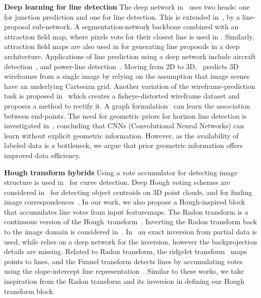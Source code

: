 \documentclass[runningheads]{llncs}
\begin{document}
\textbf{Deep learning for line detection}
The deep network in~\cite{huang2018learning} uses two heads: one for junction prediction and one for line detection. This is extended in~\cite{zhou2019end}, by a line-proposal sub-network.
A segmentation-network backbone combined with an attraction field map, where pixels vote for their closest line is used in \cite{xue2019learning}.
Similarly, attraction field maps are also used in \cite{xue2020holistically} for generating line proposals in a deep architecture.  Applications of line prediction using a deep network include aircraft detection~\cite{wei2019x}, and  power-line detection~\cite{nguyen2019ls}. Moving from 2D to 3D,~\cite{zhou2019learning} predicts 3D wireframes from a single image by relying on the assumption that image scenes have an underlying Cartesian grid.
Another variation of the wireframe-prediction task is proposed in~\cite{xue2019learning} which creates a fisheye-distorted wireframe dataset and proposes a method to rectify it. A graph formulation~\cite{zhang2019ppgnet} can learn the association between end-points. 
The need for geometric priors for horizon line detection is investigated in~\cite{workman2016horizon}, concluding that CNNs (Convolutional Neural Networks) can learn without explicit geometric information.  
However, as the availability of labeled data is a bottleneck, we argue that prior geometric information offers improved data efficiency.


\textbf{Hough transform hybrids}
Using a vote accumulator for detecting image structure is used in~\cite{beltrametti2019geometry} for curve detection.
Deep Hough voting schemes are considered in~\cite{qi2019deep} for detecting object centroids on 3D point clouds, and for finding image correspondences~\cite{min2019hyperpixel}.
In our work, we also propose a Hough-inspired block that accumulates line votes from input featuremaps. The Radon transform is a continuous version of the Hough~transform~\cite{beatty2012radon,magnusson1993linogram,toft1996radon}.
Inverting the Radon transform back to the image domain is considered in~\cite{He2018RadonIV,rim2020exact}.
In~\cite{rim2020exact} an exact inversion from partial data is used, while \cite{He2018RadonIV} relies on a deep network for the inversion, however the backprojection details are missing.
Related to Radon transform, the ridgelet transform~\cite{do2003finite} maps points to lines, and the Funnel transform detects lines by accumulating votes using the slope-intercept line representation~\cite{wei2019funnel}.
Similar to these works, we take inspiration from the Radon transform and its inversion in defining our Hough transform block.
\end{document}

